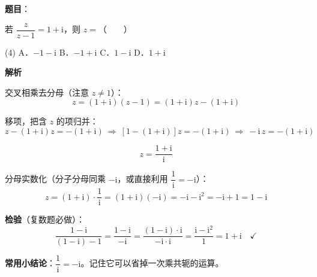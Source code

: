 \begin{answer}

\textbf{题目}：

若 $\dfrac{z}{z-1}=1+\mathrm{i}$，则 $z=$\mbox{（　　）}

\begin{gkopts}(4)
\task A．$-1-\mathrm{i}$
\task B．$-1+\mathrm{i}$
\task C．$1-\mathrm{i}$
\task D．$1+\mathrm{i}$
\end{gkopts}

\textbf{解析}

交叉相乘去分母（注意 $z\ne1$）：
\nopagebreak[4]
\[z=(1+\mathrm i)(z-1)=(1+\mathrm i)z-(1+\mathrm i)\]

移项，把含 $z$ 的项归并：
\nopagebreak[4]
\[z-(1+\mathrm i)z=-(1+\mathrm i)\ \Longrightarrow\ \left[1-(1+\mathrm i)\right]z=-(1+\mathrm i)\ \Longrightarrow\ -\mathrm i\,z=-(1+\mathrm i)\]

\nopagebreak[4]
\[z=\frac{1+\mathrm i}{\mathrm i}\]

分母实数化（分子分母同乘 $-\mathrm i$，或直接利用 $\dfrac1{\mathrm i}=-\mathrm i$）：
\nopagebreak[4]
\[z=(1+\mathrm i)\cdot\frac1{\mathrm i}=(1+\mathrm i)(-\mathrm i)=-\mathrm i-\mathrm i^{2}=-\mathrm i+1=1-\mathrm i\]

\textbf{检验}（复数题必做）：
\nopagebreak[4]
\[\frac{1-\mathrm i}{(1-\mathrm i)-1}=\frac{1-\mathrm i}{-\mathrm i}=\frac{(1-\mathrm i)\cdot\mathrm i}{-\mathrm i\cdot\mathrm i}=\frac{\mathrm i-\mathrm i^{2}}{1}=1+\mathrm i\quad\checkmark\]

\begin{gktip}
\textbf{常用小结论}：$\dfrac1{\mathrm i}=-\mathrm i$。记住它可以省掉一次乘共轭的运算。
\end{gktip}


\par\medskip

\end{answer}
